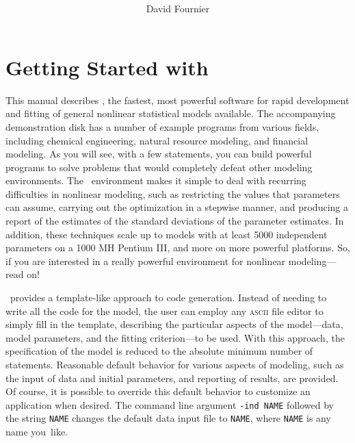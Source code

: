 \documentclass{admbmanual}
\begin{document}
\title{%
}

\author{David Fournier}


\maketitle

\tableofcontents

\chapter{Getting Started with \ADM}

This manual describes \ADM, the fastest, most powerful
software for rapid development and fitting of general nonlinear statistical
models available. The accompanying demonstration disk 
has a number of example  programs from various fields,
including chemical engineering, natural resource modeling, and
financial modeling. As you will see, with a few
statements, you can build powerful programs to solve
problems that would completely defeat other
modeling environments. The \ADM\ environment makes
it simple to deal with recurring difficulties in nonlinear
modeling, such as restricting the values that parameters can assume,
carrying out the optimization in a stepwise manner, and
producing a report of the estimates of the standard deviations
of the parameter estimates.  In addition, these techniques scale up
to models with at least 5000 independent parameters on a 1000 MH Pentium III,
and more on more powerful platforms. So, if you are interested in
a really powerful environment for nonlinear
modeling---read on!

\ADM\ provides a template-like approach to code generation.
Instead of needing to write all the code for 
the model, the user can employ any \textsc{ascii} file editor to simply fill
 in the template, describing the 
particular aspects of the model---data, model parameters, and
the  fitting criterion---to be used. 
With this approach, the specification of 
the model is reduced to the absolute minimum number of
statements. Reasonable default behavior
for various aspects of modeling, such as the input of data and
initial parameters, and reporting of results, are provided.
Of course, it is possible to override
this default behavior to customize an application when desired.
The command line argument \texttt{-ind NAME} followed by the string \texttt{NAME} changes the
default data input file to \texttt{NAME}, where \texttt{NAME} is any name you~like. 
\end{document}
